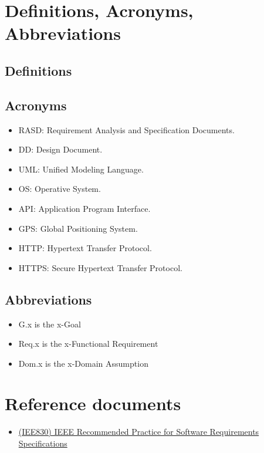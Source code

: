 	\section{Definitions, Acronyms, Abbreviations}
		
		\subsection{Definitions}

		\subsection{Acronyms}
			\begin{itemize}
				\item RASD: Requirement Analysis and Specification Documents.
				\item DD: Design Document.
				\item UML: Unified Modeling Language.
				\item OS: Operative System.
				\item API: Application Program Interface.
				\item GPS: Global Positioning System.
				\item HTTP: Hypertext Transfer Protocol.
				\item HTTPS: Secure Hypertext Transfer Protocol.
			\end{itemize}

		\subsection{Abbreviations}
			\begin{itemize}
				\item G.x is the x-Goal
				\item Req.x is the x-Functional Requirement
				\item Dom.x is the x-Domain Assumption
			\end{itemize}
		
	\section{Reference documents}
		\begin{itemize}
			\item \href{http://www.math.uaa.alaska.edu/~afkjm/cs401/IEEE830.pdf}{(IEE830) IEEE Recommended Practice for Software Requirements Specifications}
		\end{itemize}
		
